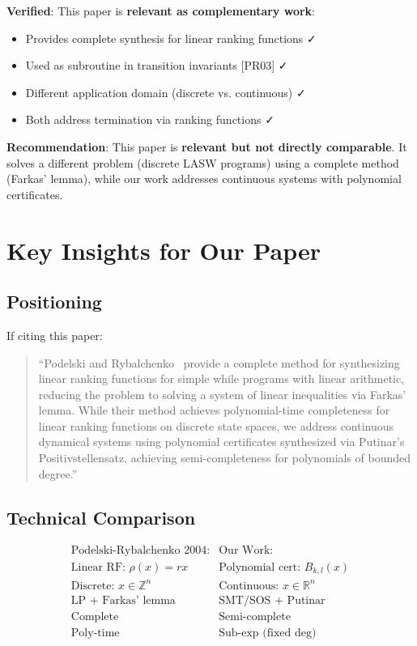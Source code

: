 \documentclass{article}
\begin{document}
\textbf{Verified}: This paper is \textbf{relevant as complementary work}:
\begin{itemize}
    \item Provides complete synthesis for linear ranking functions ✓
    \item Used as subroutine in transition invariants [PR03] ✓
    \item Different application domain (discrete vs. continuous) ✓
    \item Both address termination via ranking functions ✓
\end{itemize}

\textbf{Recommendation}: This paper is \textbf{relevant but not directly comparable}. It solves a different problem (discrete LASW programs) using a complete method (Farkas' lemma), while our work addresses continuous systems with polynomial certificates.

\section{Key Insights for Our Paper}

\subsection{Positioning}

If citing this paper:

\begin{quote}
``Podelski and Rybalchenko~\cite{podelski2004complete} provide a complete method for synthesizing linear ranking functions for simple while programs with linear arithmetic, reducing the problem to solving a system of linear inequalities via Farkas' lemma. While their method achieves polynomial-time completeness for linear ranking functions on discrete state spaces, we address continuous dynamical systems using polynomial certificates synthesized via Putinar's Positivstellensatz, achieving semi-completeness for polynomials of bounded degree.''
\end{quote}

\subsection{Technical Comparison}

\begin{equation}
\begin{array}{cc}
\text{Podelski-Rybalchenko 2004:} & \text{Our Work:}\\
\text{Linear RF: } \rho(x) = rx & \text{Polynomial cert: } B_{k,l}(x)\\
\text{Discrete: } x \in \mathbb{Z}^n & \text{Continuous: } x \in \mathbb{R}^n\\
\text{LP + Farkas' lemma} & \text{SMT/SOS + Putinar}\\
\text{Complete} & \text{Semi-complete}\\
\text{Poly-time} & \text{Sub-exp (fixed deg)}
\end{array}
\end{equation}
\end{document}
